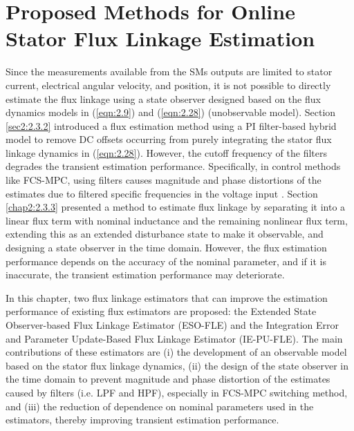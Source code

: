 \chapter{Proposed Methods for Online Stator Flux Linkage Estimation}\label{chapter3}
Since the measurements available from the SMs outputs are limited to stator current, electrical angular velocity, and position, it is not possible to directly estimate the flux linkage using a state observer designed based on the flux dynamics models in (\ref{eqn:2.9}) and (\ref{eqn:2.28}) (unobservable model). Section \ref{sec2:2.3.2} introduced a flux estimation method using a PI filter-based hybrid model to remove DC offsets occurring from purely integrating the stator flux linkage dynamics in (\ref{eqn:2.28}). However, the cutoff frequency of the filters degrades the transient estimation performance. Specifically, in control methods like FCS-MPC, using filters causes magnitude and phase distortions of the estimates due to filtered specific frequencies in the voltage input \cite{c3.2_1}. Section \ref{chap2:2.3.3} presented a method to estimate flux linkage by separating it into a linear flux term with nominal inductance and the remaining nonlinear flux term, extending this as an extended disturbance state to make it observable, and designing a state observer in the time domain. However, the flux estimation performance depends on the accuracy of the nominal parameter, and if it is inaccurate, the transient estimation performance may deteriorate.

In this chapter, two flux linkage estimators that can improve the estimation performance of existing flux estimators are proposed: the Extended State Observer-based Flux Linkage Estimator (ESO-FLE) and the Integration Error and Parameter Update-Based Flux Linkage Estimator (IE-PU-FLE). The main contributions of these estimators are (i) the development of an observable model based on the stator flux linkage dynamics, (ii) the design of the state observer in the time domain to prevent magnitude and phase distortion of the estimates caused by filters (i.e. LPF and HPF), especially in FCS-MPC switching method, and (iii) the reduction of dependence on nominal parameters used in the estimators, thereby improving transient estimation performance.

